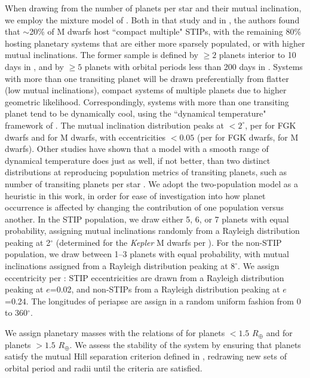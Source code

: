 \documentclass[twocolumn]{aastex631}
\begin{document}
When drawing from the number of planets per star and their mutual inclination, we employ the mixture model of \cite{Ballard16}. Both in that study and in \cite{Muirhead15}, the authors found that $\sim$20\% of M dwarfs host ``compact multiple" STIPs, with the remaining 80\% hosting planetary systems that are either more sparsely populated, or with higher mutual inclinations. The former sample is defined by $\ge2$ planets interior to 10 days in \cite{Muirhead15}, and by $\ge5$ planets with orbital periods less than 200 days in \cite{Ballard16}. Systems with more than one transiting planet will be drawn preferentially from flatter (low mutual inclinations), compact systems of multiple planets due to higher geometric likelihood. Correspondingly, systems with more than one transiting planet tend to be dynamically cool, using the ``dynamical temperature" framework of \cite{Tremaine15}. The mutual inclination distribution peaks at $<2^{\circ}$, per \cite{fabrycky_architecture_2014} for FGK dwarfs and \citealt{Ballard16} for M dwarfs, with eccentricities $<0.05$ (per \citealt{VanEylen_2019} for FGK dwarfs, \citealt{sagear_orbital_2023} for M dwarfs). Other studies have shown that a model with a smooth range of dynamical temperature does just as well, if not better, than two distinct distributions at reproducing population metrics of transiting planets, such as number of transiting planets per star \citep{Zhu18,Millholland21, He19, He20}. We adopt the two-population model as a heuristic in this work, in order for ease of investigation into how planet occurrence is affected by changing the contribution of one population versus another. In the STIP population, we draw either 5, 6, or 7 planets with equal probability, assigning mutual inclinations randomly from a Rayleigh distribution peaking at 2$^{\circ}$ (determined for the \textit{Kepler} M dwarfs per \citealt{Ballard16}). For the non-STIP population, we draw between 1--3 planets with equal probability, with mutual inclinations assigned from a Rayleigh distribution peaking at $8^{\circ}$. We assign eccentricity per \cite{sagear_orbital_2023}: STIP eccentricities are drawn from a Rayleigh distribution peaking at $e$=0.02, and non-STIPs from a Rayleigh distribution peaking at $e$=0.24. The longitudes of periapse are assign in a random uniform fashion from 0 to 360$^{\circ}$. 

 We assign planetary masses with the relations of \cite{zeng_simple_2017} for planets $<1.5$ $R_{\oplus}$ and \cite{Wolfgang16} for planets $>1.5$ $R_{\oplus}$. We assess the stability of the system by ensuring that planets satisfy the mutual Hill separation criterion defined in \cite{Fabrycky12a}, redrawing new sets of orbital period and radii until the criteria are satisfied. 
\end{document}
